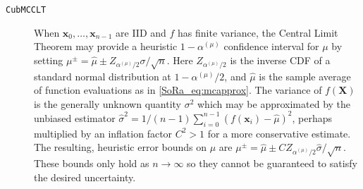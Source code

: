 \documentclass[graybox]{svmult}
\begin{document}
\begin{description}
    \item[\texttt{CubMCCLT}] When $\boldsymbol{x}_0,\dots,\boldsymbol{x}_{n-1}$ are IID and $f$ has finite variance, the Central Limit Theorem may provide a heuristic $1-\alpha^{(\mu)}$ confidence interval for $\mu$ by setting $\mu^\pm = \hat{\mu} \pm Z_{\alpha^{(\mu)}/2}\sigma/\sqrt{n}$. Here $Z_{\alpha^{(\mu)}/2}$ is the inverse CDF of a standard normal distribution at $1-\alpha^{(\mu)}/2$, and $\hat{\mu}$ is the sample average of function evaluations as in \eqref{SoRa_eq:mcapprox}. The variance of $f(\boldsymbol{X})$ is the generally unknown quantity $\sigma^2$ which may be approximated by the unbiased estimator $\hat{\sigma}^2 = 1/(n-1)\sum_{i=0}^{n-1}(f(\boldsymbol{x}_i)-\hat{\mu})^2$, perhaps multiplied by an inflation factor $C^2>1$ for a more conservative estimate. The resulting, heuristic error bounds on $\mu$ are $\mu^\pm = \hat{\mu} \pm CZ_{\alpha^{(\mu)}/2} \hat{\sigma} / \sqrt{n}$. These bounds only hold as $n \to \infty$ so they cannot be guaranteed to satisfy the desired uncertainty.
    

\end{description}
\end{document}
